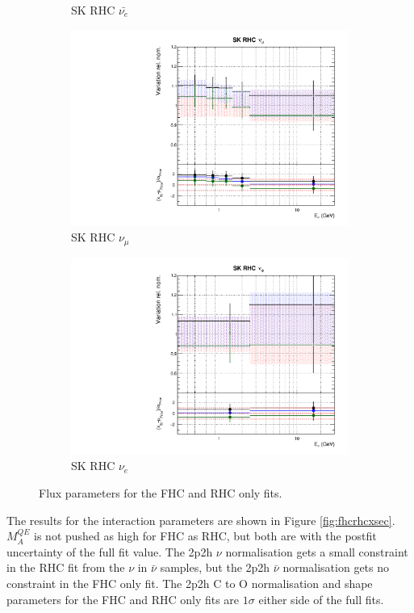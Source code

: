 \begin{figure}
\begin{subfigure}{0.24\textwidth}
  \caption{SK RHC $\bar{\nu_e}$}
\end{subfigure}
\begin{subfigure}{0.24\textwidth}
  \centering
  \includegraphics[width=0.95\linewidth]{figs/fhcrhcfitsflux_14}
  \caption{SK RHC $\nu_{\mu}$}
\end{subfigure}
\begin{subfigure}{0.24\textwidth}
  \centering
  \includegraphics[width=0.95\linewidth]{figs/fhcrhcfitsflux_15}
  \caption{SK RHC $\nu_e$}
\end{subfigure}
\caption{Flux parameters for the FHC and RHC only fits.}
\label{fig:fhcrhcflux}
\end{figure}

The results for the interaction parameters are shown in Figure \ref{fig:fhcrhcxsec}. $M_{A}^{QE}$ is not pushed as high for FHC as RHC, but both are with the postfit uncertainty of the full fit value. The 2p2h $\nu$ normalisation gets a small constraint in the RHC fit from the $\nu$ in $\bar{\nu}$ samples, but the 2p2h $\bar{\nu}$ normalisation gets no constraint in the FHC only fit. The 2p2h C to O normalisation and shape parameters for the FHC and RHC only fits are $1\sigma$ either side of the full fits. 

